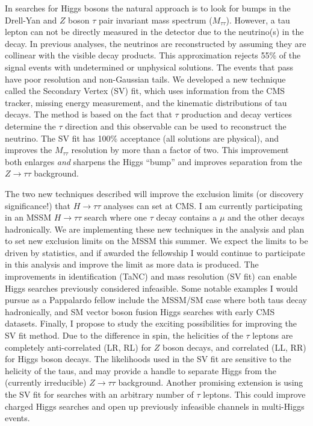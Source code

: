 \documentclass[a4paper,11pt,oneside]{amsart}
\begin{document}
In searches for Higgs bosons the natural approach is to look for bumps in the
Drell-Yan and $Z$ boson $\tau$ pair invariant mass spectrum ($M_{\tau\tau}$).
However, a tau lepton can not be directly measured in the detector due to the
neutrino(s) in the decay.  In previous analyses, the neutrinos are reconstructed
by assuming they are collinear with the visible decay products.  This
approximation rejects 55\% of the signal events with undetermined or unphysical
solutions.  The events that pass have poor resolution and non-Gaussian tails.
We developed a new technique called the Secondary Vertex (SV) fit, which uses
information from the CMS tracker, missing energy measurement, and the kinematic
distributions of tau decays.  The method is based on the fact that $\tau$ production
and decay vertices determine the $\tau$ direction and this observable can be
used to reconstruct the neutrino.  The SV fit has 100\% acceptance (all
solutions are physical), and improves the $M_{\tau\tau}$ resolution by more than
a factor of two. This improvement both enlarges \emph{and} sharpens the Higgs
``bump'' and improves separation from the $Z\rightarrow\tau\tau$ background.

The two new techniques described will improve the exclusion limits (or discovery
significance!) that $H\rightarrow\tau\tau$ analyses can set at CMS.  I am
currently participating in an MSSM $H \rightarrow \tau\tau$ search where one
$\tau$ decay contains a $\mu$ and the other decays hadronically. We are
implementing these new techniques in the analysis and plan to set new exclusion
limits on the MSSM this summer.  We expect the limits to be driven by
statistics, and if awarded the fellowship I would continue to participate in
this analysis and improve the limit as more data is produced. The improvements
in identification (TaNC) and mass resolution (SV fit) can enable Higgs searches
previously considered infeasible.  Some notable examples I would pursue as a
Pappalardo fellow include the MSSM/SM case where both taus decay hadronically,
and SM vector boson fusion Higgs searches with early CMS datasets.  Finally, I
propose to study the exciting possibilities for improving the SV fit method.
Due to the difference in spin, the helicities of the $\tau$ leptons are
completely anti-correlated (LR, RL) for $Z$ boson decays, and correlated (LL,
RR) for Higgs boson decays. The likelihoods used in the SV fit are sensitive to
the helicity of the taus, and may provide a handle to separate Higgs from the
(currently irreducible) $Z\rightarrow\tau\tau$ background.  Another promising
extension is using the SV fit for searches with an arbitrary number of $\tau$ 
\nopagebreak leptons.  This could improve charged Higgs searches and open up previously
infeasible channels in multi-Higgs events.  
\end{document}

